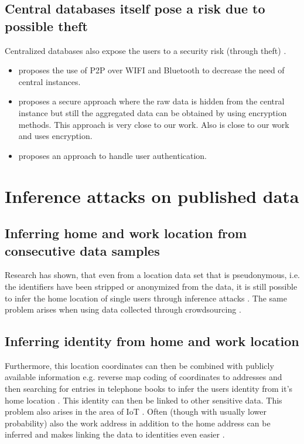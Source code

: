 \subsection{Central databases itself pose a risk due to possible theft}
Centralized databases also expose the users to a security risk (through theft) \parencite{iot, hoh2006enhancing}.

\begin{itemize}
		\item \parencite{p2p-android} proposes the use of P2P over WIFI and Bluetooth to decrease the need of central instances.
		\item \parencite{crowdsourcing} proposes a secure approach where the raw data is hidden from the central instance but still the aggregated data can be obtained by using encryption methods. This approach is very close to our work. Also \parencite{hoh2006enhancing} is close to our work and uses encryption.
		\item \parencite{hoh2006enhancing} proposes an approach to handle user authentication.
	\end{itemize}

\section{Inference attacks on published data}

\subsection{Inferring home and work location from consecutive data samples}
Research has shown, that even from a location data set that is pseudonymous, i.e. the identifiers have been stripped or anonymized from the data, it is still possible to infer the home location of single users through inference attacks \parencite{krumm, cellphone, privacy-home-work-pairs, hoh2006enhancing, twitter}. The same problem arises when using data collected through crowdsourcing \parencite{crowdsourcing}.

\subsection{Inferring identity from home and work location}
Furthermore, this location coordinates can then be combined with publicly available information e.g. reverse map coding of coordinates to addresses and then searching for entries in telephone books to infer the users identity from it's home location \parencite{krumm, privacy-home-work-pairs, hoh2006enhancing}. This identity can then be linked to other sensitive data. This problem also arises in the area of IoT \parencite{iot, hoh2006enhancing}.
Often (though with usually lower probability) also the work address in addition to the home address can be inferred and makes linking the data to identities even easier \parencite{cellphone, privacy-home-work-pairs}.

